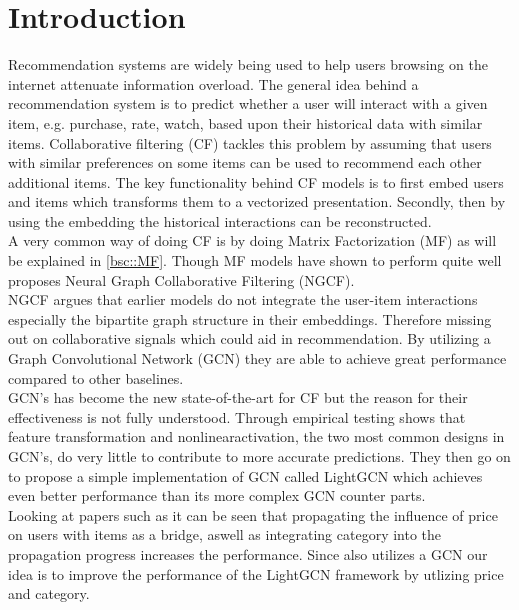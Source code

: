 \section{Introduction}
Recommendation systems are widely being used to help users browsing on the internet attenuate information overload\cite{YT_rec,Pint_rec}.
The general idea behind a recommendation system is to predict whether a user will interact with a given item, e.g. purchase, rate, watch, based upon their historical data with similar items.
Collaborative filtering (CF) tackles this problem by assuming that users with similar preferences on some items can be used to recommend each other additional items.
The key functionality behind CF models is to first embed users and items which transforms them to a vectorized presentation.
Secondly, then by using the embedding the historical interactions can be reconstructed.
\\
A very common way of doing CF is by doing Matrix Factorization (MF) as will be explained in \autoref{bsc::MF}.
Though MF models have shown to perform quite well \cite{NGCF_2019} proposes Neural Graph Collaborative Filtering (NGCF).
\\ 
NGCF argues that earlier models do not integrate the user-item interactions especially the bipartite graph structure in their embeddings.
Therefore missing out on collaborative signals which could aid in recommendation.
By utilizing a Graph Convolutional Network (GCN) they are able to achieve great performance compared to other baselines.
\\
GCN's has become the new state-of-the-art for CF but the reason for their effectiveness is not fully understood\cite{lightgcn}.
Through empirical testing \cite{lightgcn} shows that feature transformation and nonlinearactivation, the two most common designs in GCN's, do very little to contribute to more accurate predictions.
They then go on to propose a simple implementation of GCN called LightGCN which achieves even better performance than its more complex GCN counter parts.
\\
Looking at papers such as \cite{Priceaware} it can be seen that propagating the influence of price on users with items as a bridge, aswell as integrating category into the propagation progress increases the performance.
Since \cite{Priceaware} also utilizes a GCN our idea is to improve the performance of the LightGCN framework by utlizing price and category.
